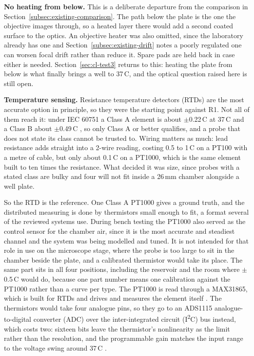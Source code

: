 \textbf{No heating from below.} This is a deliberate departure from the comparison in Section~\ref{subsec:existing-comparison}. The path below the plate is the one the objective images through, so a heated layer there would add a second coated surface to the optics. An objective heater was also omitted, since the laboratory already has one and Section~\ref{subsec:existing-drift} notes a poorly regulated one can worsen focal drift rather than reduce it. Spare pads are held back in case either is needed. Section~\ref{sec:cl-test3} returns to this: heating the plate from below is what finally brings a well to 37\,\textdegree{}C, and the optical question raised here is still open.

\textbf{Temperature sensing.} Resistance temperature detectors (RTDs) are the most accurate option in principle, so they were the starting point against R1. Not all of them reach it: under IEC 60751 a Class A element is about $\pm$0.22\,\textdegree{}C at 37\,\textdegree{}C and a Class B about $\pm$0.49\,\textdegree{}C \citep{iec_60751_2008}, so only Class A or better qualifies, and a probe that does not state its class cannot be trusted to. Wiring matters as much: lead resistance adds straight into a 2-wire reading, costing 0.5 to 1\,\textdegree{}C on a PT100 with a metre of cable, but only about 0.1\,\textdegree{}C on a PT1000, which is the same element built to ten times the resistance. What decided it was size, since probes with a stated class are bulky and four will not fit inside a 26\,mm chamber alongside a well plate.

So the RTD is the reference. One Class A PT1000 gives a ground truth, and the distributed measuring is done by thermistors small enough to fit, a format several of the reviewed systems use. During bench testing the PT1000 also served as the control sensor for the chamber air, since it is the most accurate and steadiest channel and the system was being modelled and tuned. It is not intended for that role in use on the microscope stage, where the probe is too large to sit in the chamber beside the plate, and a calibrated thermistor would take its place. The same part sits in all four positions, including the reservoir and the room where $\pm$0.5\,\textdegree{}C would do, because one part number means one calibration against the PT1000 rather than a curve per type. The PT1000 is read through a MAX31865, which is built for RTDs and drives and measures the element itself \citep{maxim_max31865_2015}. The thermistors would take four analogue pins, so they go to an ADS1115 analogue-to-digital converter (ADC) over the inter-integrated circuit (I\textsuperscript{2}C) bus instead, which costs two: sixteen bits leave the thermistor's nonlinearity as the limit rather than the resolution, and the programmable gain matches the input range to the voltage swing around 37\,\textdegree{}C \citep{ti_ads1115_2018}.

